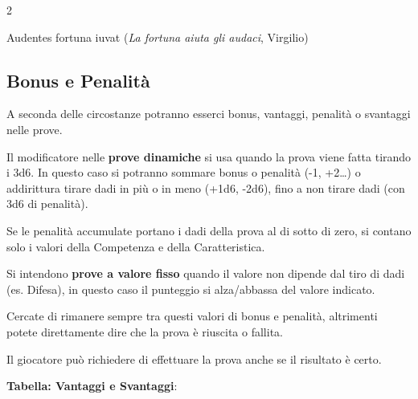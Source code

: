 \begin{multicols}{2}
\begin{enfasi}{Audentes fortuna iuvat (\emph{La fortuna aiuta gli audaci}, Virgilio) }\end{enfasi}

\subsection{Bonus e Penalità} \label{vantaggi}

A seconda delle circostanze potranno esserci bonus, vantaggi, penalità o svantaggi nelle prove.

Il modificatore nelle \textbf{prove dinamiche} si usa quando la prova viene fatta tirando i 3d6. In questo caso si potranno sommare bonus o penalità (-1, +2…) o addirittura tirare dadi in più o in meno (+1d6, -2d6), fino a non tirare dadi (con 3d6 di penalità).

Se le penalità accumulate portano i dadi della prova al di sotto di zero, si contano solo i valori della Competenza e della Caratteristica.

Si intendono \textbf{prove a valore fisso}  quando il valore non dipende dal tiro di dadi (es. Difesa), in questo caso il punteggio si alza/abbassa del valore indicato.

Cercate di rimanere sempre tra questi valori di bonus e penalità, altrimenti potete direttamente dire che la prova è riuscita o fallita.

Il giocatore può richiedere di effettuare la prova anche se il risultato è certo.

\smallskip

\textbf{Tabella: Vantaggi e Svantaggi}:

\smallskip



\end{multicols}
